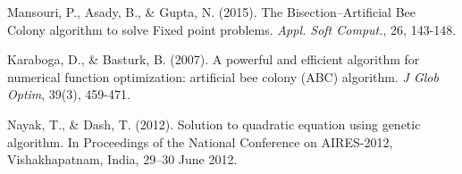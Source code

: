 \documentclass[amsmath, amssymb, aps]{revtex4-2}
\begin{document}
\begin{thebibliography}{99}
Mansouri, P., Asady, B., \& Gupta, N. (2015). The Bisection–Artificial Bee Colony algorithm to solve Fixed point problems. \textit{Appl. Soft Comput.}, 26, 143-148.

Karaboga, D., \& Basturk, B. (2007). A powerful and efficient algorithm for numerical function optimization: artificial bee colony (ABC) algorithm. \textit{J Glob Optim}, 39(3), 459-471.

Nayak, T., \& Dash, T. (2012). Solution to quadratic equation using genetic algorithm. In Proceedings of the National Conference on AIRES-2012, Vishakhapatnam, India, 29–30 June 2012.

\end{thebibliography}
\end{document}
